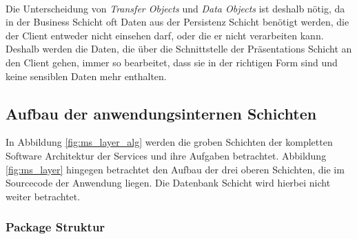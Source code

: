 \\
\linebreak
Die Unterscheidung von \textit{Transfer Objects} und \textit{Data Objects} ist deshalb nötig, da in der Business Schicht oft Daten aus der Persistenz Schicht benötigt werden, die der Client entweder nicht einsehen darf, oder die er nicht verarbeiten kann. Deshalb werden die Daten, die über die Schnittstelle der Präsentations Schicht an den Client gehen, immer so bearbeitet, dass sie in der richtigen Form sind und keine sensiblen Daten mehr enthalten.

\subsection*{Aufbau der anwendungsinternen Schichten}

In Abbildung \ref{fig:ms_layer_alg} werden die groben Schichten der kompletten Software Architektur der Services und ihre Aufgaben betrachtet. Abbildung \ref{fig:ms_layer} hingegen betrachtet den Aufbau der drei oberen Schichten, die im Sourcecode der Anwendung liegen. Die Datenbank Schicht wird hierbei nicht weiter betrachtet. 

\subsubsection*{Package Struktur}


